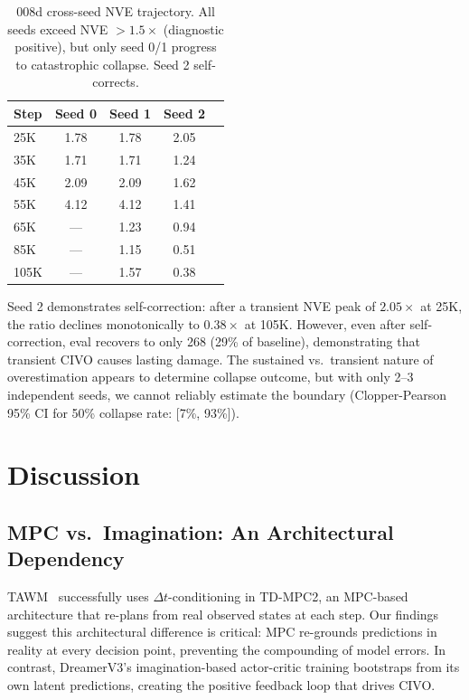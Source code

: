 \documentclass[10pt,letterpaper]{article}
\newcommand{\dt}{\Delta t}
\begin{document}
\begin{table}[h]
\centering
\caption{008d cross-seed NVE trajectory. All seeds exceed NVE $> 1.5\times$ (diagnostic positive), but only seed 0/1 progress to catastrophic collapse. Seed 2 self-corrects.}
\label{tab:008d_nve_traj}
\begin{tabular}{lcccc}
\toprule
\textbf{Step} & \textbf{Seed 0} & \textbf{Seed 1} & \textbf{Seed 2} \\
\midrule
25K  & 1.78 & 1.78 & 2.05 \\
35K  & 1.71 & 1.71 & 1.24 \\
45K  & 2.09 & 2.09 & 1.62 \\
55K  & 4.12 & 4.12 & 1.41 \\
65K  & ---  & 1.23 & 0.94 \\
85K  & ---  & 1.15 & 0.51 \\
105K & ---  & 1.57 & 0.38 \\
\bottomrule
\end{tabular}
\end{table}

Seed 2 demonstrates self-correction: after a transient NVE peak of $2.05\times$ at 25K, the ratio declines monotonically to $0.38\times$ at 105K. However, even after self-correction, eval recovers to only 268 (29\% of baseline), demonstrating that transient CIVO causes lasting damage. The sustained vs.\ transient nature of overestimation appears to determine collapse outcome, but with only 2--3 independent seeds, we cannot reliably estimate the boundary (Clopper-Pearson 95\% CI for 50\% collapse rate: [7\%, 93\%]).

\section{Discussion}
\label{sec:discussion}

\subsection{MPC vs.\ Imagination: An Architectural Dependency}

TAWM~\citep{nhu2025tawm} successfully uses $\dt$-conditioning in TD-MPC2, an MPC-based architecture that re-plans from real observed states at each step. Our findings suggest this architectural difference is critical: MPC re-grounds predictions in reality at every decision point, preventing the compounding of model errors. In contrast, DreamerV3's imagination-based actor-critic training bootstraps from its own latent predictions, creating the positive feedback loop that drives CIVO.
\end{document}
